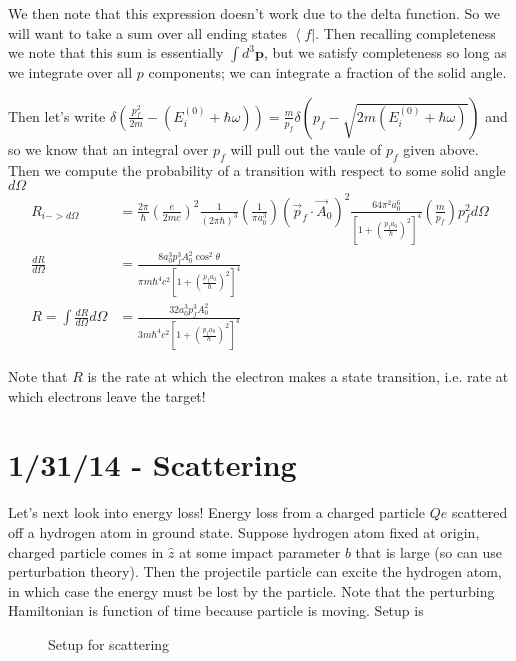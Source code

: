 \documentclass[10pt]{report}
\newcommand{\bra}[1]{\left<#1\right|}
\newcommand{\rd}[2]{\frac{d#1}{d#2}}
\begin{document}
We then note that this expression doesn't work due to the delta function. So we will want to take a sum over all ending states $\bra{f}$. Then recalling completeness we note that this sum is essentially $\int d^3\mathbf{p}$, but we satisfy completeness so long as we integrate over all $p$ components; we can integrate a fraction of the solid angle.

Then let's write $\delta\left( \frac{p_f^2}{2m} - (E_i^{(0)} + \hbar\omega) \right) = \frac{m}{p_f}\delta(p_f - \sqrt{2m(E_i^{(0)} + \hbar\omega)})$ and so we know that an integral over $p_f$ will pull out the vaule of $p_f$ given above. Then we compute the probability of a transition with respect to some solid angle $d\Omega$
\begin{align}
    R_{i -> d\Omega} &= \frac{2\pi}{\hbar}\left( \frac{e}{2mc} \right)^2\frac{1}{(2\pi\hbar)^3}\left( \frac{1}{\pi a_0^3} \right)(\vec{p}_f \cdot \vec{A}_0)^2 \frac{64\pi^2 a_0^6}{\left[ 1 + \left( \frac{p_f a_0}{\hbar} \right)^2 \right]^4}\left(\frac{m}{p_f}\right) p_f^2 d\Omega\\
    \rd{R}{\Omega} &= \frac{8a_0^3p_f^3A_0^2\cos^2\theta}{\pi m\hbar^4c^2\left[ 1 + \left(\frac{p_fa_0}{\hbar}\right)^2 \right]^4}\\
    R = \int \rd{R}{\Omega}d\Omega &= \frac{32 a_0^3 p_f^3A_0^2}{3m\hbar^4c^2\left[ 1 + \left( \frac{p_fa_0}{\hbar} \right)^2 \right]^4}
\end{align}

Note that $R$ is the rate at which the electron makes a state transition, i.e. rate at which electrons leave the target!

\chapter{1/31/14 - Scattering}

Let's next look into energy loss! Energy loss from a charged particle $Qe$ scattered off a hydrogen atom in ground state. Suppose hydrogen atom fixed at origin, charged particle comes in $\hat{z}$ at some impact parameter $b$ that is large (so can use perturbation theory). Then the projectile particle can excite the hydrogen atom, in which case the energy must be lost by the particle. Note that the perturbing Hamiltonian is function of time because particle is moving. Setup is
\begin{figure}[!h]
    \centering
    \caption{Setup for scattering}
    \label{1.31.setup}
\end{figure}
\end{document}
